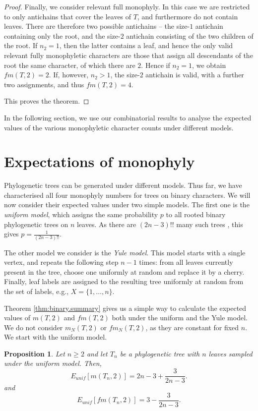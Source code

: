 \documentclass{amsart}
\newtheorem{proposition}[theorem]{Proposition}
\theoremstyle{definition}
\begin{document}
\begin{proof}
Finally, we consider relevant full monophyly. In this case we are restricted to only antichains that cover the leaves of $T$, and furthermore do not contain leaves. There are therefore two possible antichains -- the size-$1$ antichain containing only the root, and the size-$2$ antichain consisting of the two children of the root. If $n_2=1$, then the latter contains a leaf, and hence the only valid relevant fully monophyletic characters are those that assign all descendants of the root the same character, of which there are $2$. Hence if $n_2=1$, we obtain $fm(T,2)=2$. If, however, $n_2>1$, the size-$2$ antichain is valid, with a further two assignments, and thus $fm(T,2)=4$.

This proves the theorem.
\end{proof}

In the following section, we use our combinatorial results to analyse the expected values of the various monophyletic character counts under different models. 

\section{Expectations of monophyly}\label{s:expmon}

Phylogenetic trees can be generated under different models. Thus far, we have characterised all four monophyly numbers for trees on binary characters. We will now consider their expected values under two simple models. The first one is the \emph{uniform model}, which assigns the same probability $p$ to all rooted binary phylogenetic trees on $n$ leaves. As there are $(2n-3)!!$ many such trees \cite{Semple2003}, this gives $p=\frac{1}{(2n-3)!!}$. 

The other model we consider is the \emph{Yule model}. This model starts with a single vertex, and repeats the following step $n-1$ times: from all leaves currently present in the tree, choose one uniformly at random and replace it by a cherry. Finally, leaf labels are assigned to the resulting tree uniformly at random from the set of labels, e.g., $X=\{1,\ldots,n\}$. 

Theorem \ref{thm:binary.summary} gives us a simple way to calculate the expected values of $m(T,2)$ and $fm(T,2)$ both under the uniform and the Yule model. We do not consider $m_N(T,2)$ or $fm_N(T,2)$, as they are constant for fixed $n$. We start with the uniform model.

\begin{proposition}\label{cor_binaryuniform} 
Let $n \geq 2$ and let $T_n$ be a phylogenetic tree with $n$ leaves sampled under the uniform model. Then, 
$$E_{unif}[m(T_n,2)]=2n-3+\frac{3}{2n-3}.$$
and 
$$E_{unif}[fm(T_n,2)]=3 - \frac{3}{2n-3}.$$
\end{proposition}
\end{document}
